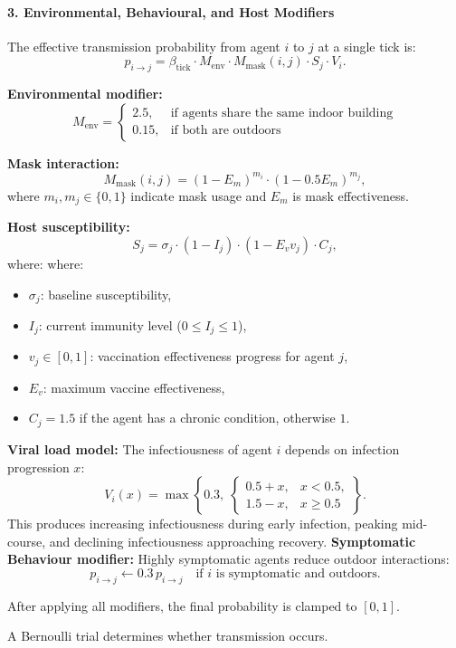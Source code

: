 \paragraph*{3. Environmental, Behavioural, and Host Modifiers}
The effective transmission probability from agent $i$ to $j$ at a single tick is:
\[
p_{i \to j}
= \beta_\mathrm{tick} \cdot M_\mathrm{env} \cdot M_\mathrm{mask}(i,j) \cdot S_j \cdot V_i.
\]

\textbf{Environmental modifier:}
\[
M_\mathrm{env} =
\begin{cases}
2.5, & \text{if agents share the same indoor building} \\
0.15, & \text{if both are outdoors}
\end{cases}
\]

\textbf{Mask interaction:}
\[
M_\mathrm{mask}(i,j)
= (1 - E_m)^{m_i} \cdot (1 - 0.5E_m)^{m_j},
\]
where $m_i,m_j\in\{0,1\}$ indicate mask usage and $E_m$ is mask effectiveness.

\textbf{Host susceptibility:}
\[
S_j = \sigma_j \cdot (1 - I_j) \cdot (1 - E_v v_j) \cdot C_j,
\]
where:
where:
\begin{itemize}
    \item $\sigma_j$: baseline susceptibility,
    \item $I_j$: current immunity level ($0 \le I_j \le 1$),
    \item $v_j \in [0,1]$: vaccination effectiveness progress for agent $j$,
    \item $E_v$: maximum vaccine effectiveness,
    \item $C_j = 1.5$ if the agent has a chronic condition, otherwise $1$.
\end{itemize}

\textbf{Viral load model:}
The infectiousness of agent $i$ depends on infection progression $x$:
\[
V_i(x) =
\max\left\{0.3,\;
\begin{cases}
0.5 + x, & x < 0.5,\\[4pt]
1.5 - x, & x \ge 0.5
\end{cases}
\right\}.
\]
This produces increasing infectiousness during early infection, peaking mid-course, and declining infectiousness approaching recovery.
\textbf{Symptomatic Behaviour modifier:}
Highly symptomatic agents reduce outdoor interactions:
\[
p_{i \to j} \leftarrow 0.3 \, p_{i \to j}
\quad\text{if $i$ is symptomatic and outdoors.}
\]

After applying all modifiers, the final probability is clamped to $[0,1]$.

A Bernoulli trial determines whether transmission occurs.

